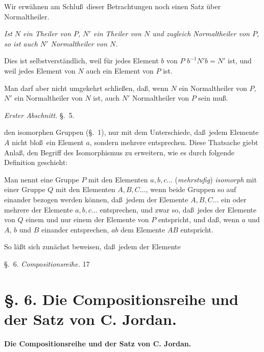 \documentclass[12pt,a4paper]{book}
\begin{document}
Wir erw\"ahnen am Schlu\ss\ dieser Betrachtungen noch einen Satz \"uber Normaltheiler.

\textit{Ist $N$ ein Theiler von $P$, $N'$ ein Theiler von $N$ und zugleich Normaltheiler von $P$, so ist auch $N'$ Normaltheiler von $N$.}

Dies ist selbstverst\"andlich, weil f\"ur jedes Element $b$ von $P$ $b^{-1}N'b = N'$ ist, und weil jedes Element von $N$ auch ein Element von $P$ ist.

Man darf aber nicht umgekehrt schlie\ss en, da\ss, wenn $N$ ein Normaltheiler von $P$, $N'$ ein Normaltheiler von $N$ ist, auch $N'$ Normaltheiler von $P$ sein mu\ss.

\newpage
{} \hfill \textit{Erster Abschnitt.} \hfill \S.~5.

\vspace{0.3cm}

den isomorphen Gruppen (\S.~1), nur mit dem Unterschiede, da\ss\ jedem Elemente $A$ nicht blo\ss\ ein Element $a$, sondern mehrere entsprechen. Diese Thatsache giebt Anla\ss, den Begriff des Isomorphismus zu erweitern, wie es durch folgende Definition geschieht:

Man nennt eine Gruppe $P$ mit den Elementen $a, b, c \ldots$ (\textit{mehrstufig}) \textit{isomorph} mit einer Gruppe $Q$ mit den Elementen $A, B, C \ldots$, wenn beide Gruppen so auf einander bezogen werden k\"onnen, da\ss\ jedem der Elemente $A, B, C \ldots$ ein oder mehrere der Elemente $a, b, c \ldots$ entsprechen, und zwar so, da\ss\ jedes der Elemente von $Q$ einem und nur einem der Elemente von $P$ entspricht, und da\ss, wenn $a$ und $A$, $b$ und $B$ einander entsprechen, $ab$ dem Elemente $AB$ entspricht.

So l\"a\ss t sich zun\"achst beweisen, da\ss\ jedem der Elemente

\newpage
\noindent\S.~6. \hfill \textit{Compositionsreihe.} \hfill 17

\vspace{0.3cm}

\section*{\S. 6. Die Compositionsreihe und der Satz von C. Jordan.}

\begin{center}
\textbf{Die Compositionsreihe und der Satz von C. Jordan.}
\end{center}
\end{document}
